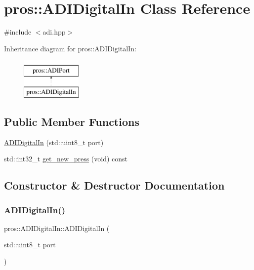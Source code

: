 \hypertarget{classpros_1_1ADIDigitalIn}{}\section{pros\+:\+:A\+D\+I\+Digital\+In Class Reference}
\label{classpros_1_1ADIDigitalIn}


{\ttfamily \#include $<$adi.\+hpp$>$}

Inheritance diagram for pros\+:\+:A\+D\+I\+Digital\+In\+:\begin{figure}[H]
\begin{center}
\leavevmode
\includegraphics[height=2.000000cm]{classpros_1_1ADIDigitalIn}
\end{center}
\end{figure}
\subsection*{Public Member Functions}
\begin{DoxyCompactItemize}
\item 
\hyperlink{classpros_1_1ADIDigitalIn_a08fd8f876b569084bf375ef59116e4f7}{A\+D\+I\+Digital\+In} (std\+::uint8\+\_\+t port)
\item 
std\+::int32\+\_\+t \hyperlink{classpros_1_1ADIDigitalIn_a27d82a95e717eeee61ed6555952a93d8}{get\+\_\+new\+\_\+press} (void) const
\end{DoxyCompactItemize}


\subsection{Constructor \& Destructor Documentation}
\mbox{\label{classpros_1_1ADIDigitalIn_a08fd8f876b569084bf375ef59116e4f7}} 
\subsubsection{\texorpdfstring{A\+D\+I\+Digital\+In()}{ADIDigitalIn()}}
{\footnotesize\ttfamily pros\+::\+A\+D\+I\+Digital\+In\+::\+A\+D\+I\+Digital\+In (\begin{DoxyParamCaption}\item[{std\+::uint8\+\_\+t}]{port }\end{DoxyParamCaption})}

